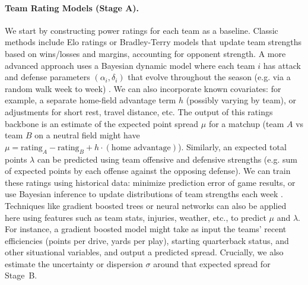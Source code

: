 \documentclass[12pt]{article}
\begin{document}
\paragraph{Team Rating Models (Stage A).} We start by constructing power ratings for each team as a baseline. Classic methods include Elo ratings or Bradley-Terry models that update team strengths based on wins/losses and margins, accounting for opponent strength. A more advanced approach uses a Bayesian dynamic model where each team $i$ has attack and defense parameters $(\alpha_i,\delta_i)$ that evolve throughout the season (e.g. via a random walk week to week) \cite{Egidi2018}. We can also incorporate known covariates: for example, a separate home-field advantage term $h$ (possibly varying by team), or adjustments for short rest, travel distance, etc. The output of this ratings backbone is an estimate of the expected point spread $\mu$ for a matchup (team $A$ vs team $B$ on a neutral field might have $\mu = \text{rating}_A - \text{rating}_B + h\cdot (\text{home advantage})$). Similarly, an expected total points $\lambda$ can be predicted using team offensive and defensive strengths (e.g. sum of expected points by each offense against the opposing defense). We can train these ratings using historical data: minimize prediction error of game results, or use Bayesian inference to update distributions of team strengths each week \cite{Egidi2018}. Techniques like gradient boosted trees or neural networks can also be applied here using features such as team stats, injuries, weather, etc., to predict $\mu$ and $\lambda$. For instance, a gradient boosted model might take as input the teams’ recent efficiencies (points per drive, yards per play), starting quarterback status, and other situational variables, and output a predicted spread. Crucially, we also estimate the uncertainty or dispersion $\sigma$ around that expected spread for Stage~B.
\end{document}
